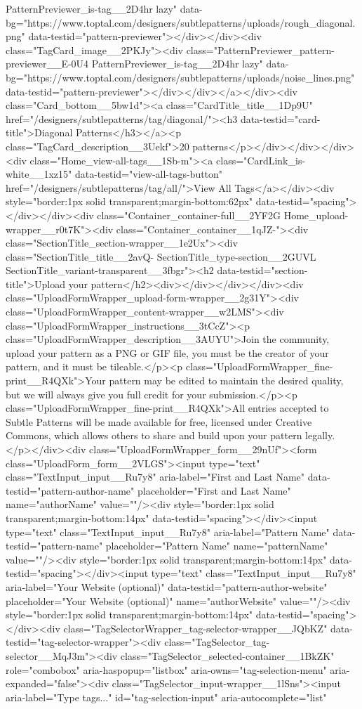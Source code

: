 PatternPreviewer_is-tag__2D4hr lazy" data-bg="https://www.toptal.com/designers/subtlepatterns/uploads/rough_diagonal.png" data-testid="pattern-previewer"></div></div><div class="TagCard_image__2PKJy"><div class="PatternPreviewer_pattern-previewer__E-0U4 PatternPreviewer_is-tag__2D4hr lazy" data-bg="https://www.toptal.com/designers/subtlepatterns/uploads/noise_lines.png" data-testid="pattern-previewer"></div></div></a></div><div class="Card_bottom__5bw1d"><a class="CardTitle_title__1Dp9U" href="/designers/subtlepatterns/tag/diagonal/"><h3 data-testid="card-title">Diagonal Patterns</h3></a><p class="TagCard_description__3Uekf">20 patterns</p></div></div></div><div class="Home_view-all-tags__1Sb-m"><a class="CardLink_is-white__1xz15" data-testid="view-all-tags-button" href="/designers/subtlepatterns/tag/all/">View All Tags</a></div><div style="border:1px solid transparent;margin-bottom:62px" data-testid="spacing"></div></div><div class="Container_container-full__2YF2G Home_upload-wrapper__r0t7K"><div class="Container_container__1qJZ-"><div class="SectionTitle_section-wrapper__1e2Ux"><div class="SectionTitle_title__2avQ- SectionTitle_type-section__2GUVL SectionTitle_variant-transparent__3fbgr"><h2 data-testid="section-title">Upload your pattern</h2><div></div></div></div><div class="UploadFormWrapper_upload-form-wrapper__2g31Y"><div class="UploadFormWrapper_content-wrapper__w2LMS"><div class="UploadFormWrapper_instructions__3tCcZ"><p class="UploadFormWrapper_description__3AUYU">Join the community, upload your pattern as a PNG or GIF file, you must be the creator of your pattern, and it must be tileable.</p><p class="UploadFormWrapper_fine-print__R4QXk">Your pattern may be edited to maintain the desired quality, but we will always give you full credit for your submission.</p><p class="UploadFormWrapper_fine-print__R4QXk">All entries accepted to Subtle Patterns will be made available for free, licensed under Creative Commons, which allows others to share and build upon your pattern legally.</p></div><div class="UploadFormWrapper_form__29nUf"><form class="UploadForm_form__2VLGS"><input type="text" class="TextInput_input__Ru7y8" aria-label="First and Last Name" data-testid="pattern-author-name" placeholder="First and Last Name" name="authorName" value=""/><div style="border:1px solid transparent;margin-bottom:14px" data-testid="spacing"></div><input type="text" class="TextInput_input__Ru7y8" aria-label="Pattern Name" data-testid="pattern-name" placeholder="Pattern Name" name="patternName" value=""/><div style="border:1px solid transparent;margin-bottom:14px" data-testid="spacing"></div><input type="text" class="TextInput_input__Ru7y8" aria-label="Your Website (optional)" data-testid="pattern-author-website" placeholder="Your Website (optional)" name="authorWebsite" value=""/><div style="border:1px solid transparent;margin-bottom:14px" data-testid="spacing"></div><div class="TagSelectorWrapper_tag-selector-wrapper__JQbKZ" data-testid="tag-selector-wrapper"><div class="TagSelector_tag-selector__MqJ3m"><div class="TagSelector_selected-container__1BkZK" role="combobox" aria-haspopup="listbox" aria-owns="tag-selection-menu" aria-expanded="false"><div class="TagSelector_input-wrapper__1lSns"><input aria-label="Type tags..." id="tag-selection-input" aria-autocomplete="list" 